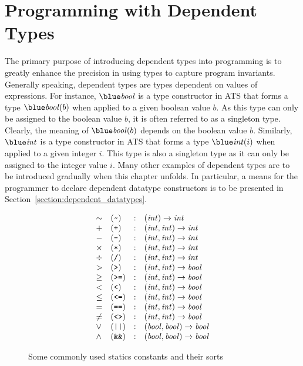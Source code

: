 \chapter{Programming with Dependent Types}

The primary purpose of introducing dependent types into programming is to
greatly enhance the precision in using types to capture program invariants.
Generally speaking, dependent types are types dependent on values of
expressions. For instance, $\tbool$ is a type constructor in ATS that forms
a type $\tbool(b)$ when applied to a given boolean value $b$. As this type
can only be assigned to the boolean value $b$, it is often referred to as a
singleton type. Clearly, the meaning of $\tbool(b)$ depends on the boolean
value $b$.  Similarly, $\tint$ is a type constructor in ATS that forms a
type $\tint(i)$ when applied to a given integer $i$. This type is also a
singleton type as it can only be assigned to the integer value $i$.  Many
other examples of dependent types are to be introduced gradually when this
chapter unfolds.  In particular, a means for the programmer to declare
dependent datatype constructors is to be presented in
Section~\ref{section:dependent_datatypes}.

\begin{figure}
\[\begin{array}{llcl}
\sim & (\verb`~`) & : & (\sint) \simp \sint \\
+ & (\verb`+`) & : & (\sint, \sint) \simp \sint \\
- & (\verb`-`) & : & (\sint, \sint) \simp \sint \\
\times & (\verb`*`) & : & (\sint, \sint) \simp \sint \\
\div & (\verb`/`) & : & (\sint, \sint) \simp \sint \\
> & (\verb`>`) & : & (\sint, \sint) \simp \sbool \\
\geq & (\verb`>=`) & : & (\sint, \sint) \simp \sbool \\
< & (\verb`<`) & : & (\sint, \sint) \simp \sbool \\
\leq & (\verb`<=`) & : & (\sint, \sint) \simp \sbool \\
= & (\verb`==`) & : & (\sint, \sint) \simp \sbool \\
\neq & (\verb`<>`) & : & (\sint, \sint) \simp \sbool \\
\lor & (\verb`||`) & : & (\sbool, \sbool) \simp \sbool \\
\land & (\verb`&&`) & : & (\sbool, \sbool) \simp \sbool \\
\end{array}\]
\caption{Some commonly used statics constants and their sorts}
\label{figure:static_constants}
\end{figure}
